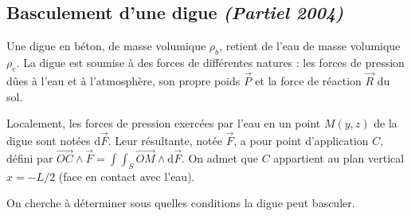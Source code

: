 {%
\subsection{Basculement d'une digue {\small \it (Partiel 2004)}}



\noindent Une digue en b\'eton, de masse volumique $\rho_b$, retient
de l'eau de masse volumique $\rho_e$. La digue est soumise \`a des
forces de diff\'erentes natures : les forces de pression d\^ues \`a
l'eau et \`a l'atmosph\`ere, son propre poids $\vec{P}$ et la force de
r\'eaction $\vec{R}$ du sol.

\noindent Localement, les forces de pression exerc\'ees par l'eau en
un point $M(y,z)$ de la digue sont not\'ees $\mathrm{d}\vec{F}$. Leur
r\'esultante, not\'ee $\vec{F}$, a pour point d'application $C$,
d\'efini par $\overrightarrow{OC} \wedge \vec{F} = \int \!\!\! \int_S
\overrightarrow{OM} \wedge \mathrm{d}\vec{F}$. On admet que $C$
appartient au plan vertical $x = -L/2$ (face en contact avec l'eau).

\noindent On cherche \`a d\'eterminer sous quelles conditions la digue
peut basculer.

}
